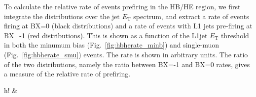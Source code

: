\documentclass[11pt]{cmspaperpdf}
\newcommand{\et}{\ensuremath{E_{\textrm{T}}}\xspace}
\begin{document}
To calculate the relative rate of events prefiring in the HB/HE region, we first integrate the distributions over the jet \et spectrum, and extract a rate of events firing at BX=0 (black distributions) and a rate of events with L1 jets pre-firing at BX=-1 (red distributions). This is shown as a function of the L1jet \et threshold in both the minumum bias (Fig.~\ref{fig:hbherate_minb}) and single-muon (Fig.~\ref{fig:hbherate_smu}) events. The rate is shown in arbitrary units. The ratio of the two distributions, namely the ratio between BX=-1 and BX=0 rates, gives a measure of the relative rate of prefiring.

\begin{2figures}{h!}
\centering
{} &
 \\

\end{2figures}
\end{document}
